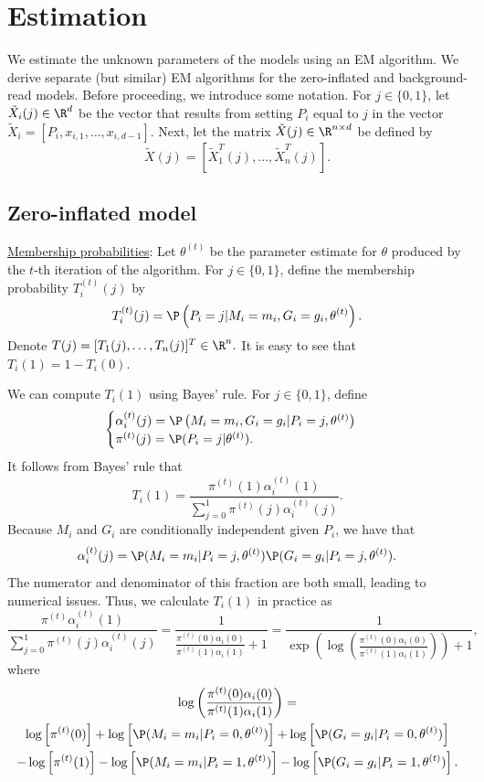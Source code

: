\documentclass[12pt]{article}
\begin{document}
\section{Estimation}\label{estimation}

We estimate the unknown parameters of the models using an EM algorithm. We derive separate (but similar) EM algorithms for the zero-inflated and background-read models. Before proceeding, we introduce some notation. For $j \in \{0,1\}$, let $\tilde{X}_i(j) \in \R^d$ be the vector that results from setting $P_i$ equal to $j$ in the vector $\tilde{X}_i = [P_i, x_{i,1}, \dots, x_{i,d-1}]$. Next, let the matrix $\tilde{X}(j) \in \R^{n \times d}$ be defined by $$ \tilde{X}(j) = [ \tilde{X}^T_1(j), \dots, \tilde{X}^T_n(j)].$$ 

\subsection{Zero-inflated model}
\underline{Membership probabilities}:  Let $\theta^{(t)}$ be the parameter estimate for $\theta$ produced by the $t$-th iteration of the algorithm. For $j \in \{0,1\}$, define the membership probability $T_i^{(t)}(j)$ by
$$T_i^{(t)}(j) = \P\left( P_i = j | M_i = m_i, G_i = g_i, \theta^{(t)} \right) .$$ Denote $T(j) = [ T_1(j), \dots, T_n(j)]^T \in \R^n.$ It is easy to see that $T_i(1) = 1 - T_i(0)$.

We can compute $T_i(1)$ using Bayes' rule. For $j \in \{0,1\}$, define $$\begin{cases} \alpha^{(t)}_i(j) = \P\left(M_i = m_i, G_i = g_i | P_i = j, \theta^{(t)} \right) \\ \pi^{(t)}(j) = \P(P_i = j | \theta^{(t)}). \end{cases}$$  It follows from Bayes' rule that
\begin{equation}\label{bayes_rule} T_i(1) = \frac{ \pi^{(t)}(1) \alpha_i^{(t)}(1)  }{ \sum_{j=0}^1 \pi^{(t)}(j) \alpha_i^{(t)}(j)}. \end{equation} Because $M_i$ and $G_i$ are conditionally independent given $P_i$, we have that
$$ \alpha_i^{(t)}(j) = \P(M_i = m_i | P_i = j, \theta^{(t)}) \P(G_i = g_i | P_i = j, \theta^{(t)}).$$ The numerator and denominator of this fraction are both small, leading to numerical issues. Thus, we calculate $T_i(1)$ in practice as
$$\frac{ \pi^{(t)}\alpha_i^{(t)}(1) } { \sum_{j=0}^1 \pi^{(t)}(j) \alpha_i^{(t)}(j)} = \frac{ 1 }{ \frac{ \pi^{(t)}(0) \alpha_i(0) }{ \pi^{(t)}(1) \alpha_i(1)} + 1} = \frac{1}{ \exp\left(\log \left(  \frac{ \pi^{(t)}(0) \alpha_i(0) }{ \pi^{(t)}(1) \alpha_i(1)} \right) \right) + 1},$$
where
\begin{multline*}
\log \left(\frac{ \pi^{(t)}(0) \alpha_i(0) }{ \pi^{(t)}(1) \alpha_i(1)} \right) =\\ \log\left[ \pi^{(t)}(0) \right] + \log \left[ \P( M_i = m_i | P_i = 0, \theta^{(t)} ) \right] +  \log \left[ \P( G_i = g_i | P_i = 0, \theta^{(t)}) \right] \\ - \log \left[ \pi^{(t)}(1) \right] - \log\left[ \P( M_i = m_i | P_i = 1, \theta^{(t)} ) \right]  - \log \left[ \P( G_i = g_i  | P_i = 1, \theta^{(t)} ) \right].
\end{multline*}
\end{document}
